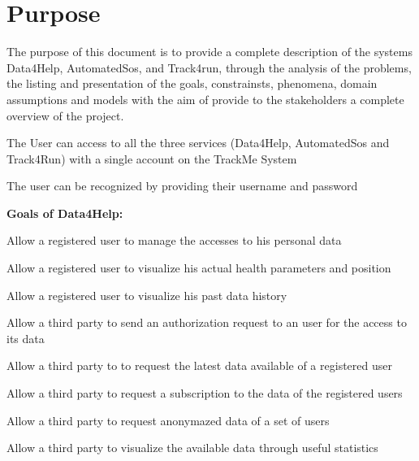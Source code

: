\section{Purpose}
The purpose of this document is to provide a complete description of the systems Data4Help, AutomatedSos, and Track4run, through the analysis of the problems, the listing and presentation of the goals, constrainsts, phenomena, domain assumptions and models with the aim of provide to the stakeholders a complete overview of the project.

\begin{goalList}
\begin{enumerate}[label={[}G\arabic*{]}]

    \item \label{goal:trackme1} The User can access to all the three services (Data4Help, AutomatedSos and Track4Run) with a single account on the TrackMe System
    \item \label{goal:trackme2}The user can be recognized by providing their username and password
    
\end{enumerate}

\textbf{Goals of Data4Help:}
\begin{enumerate}[label={[}G3.\arabic*{]}]

    \item \label{goal:user1} Allow a registered user to manage the accesses to his personal     data
    \item \label{goal:user2}Allow a registered user to visualize his actual health     parameters and position
    \item \label{goal:user3}Allow a registered user to visualize his past data history
    \item \label{goal:parties1}Allow a third party to send an authorization request to an     user for the access to its data
    \item \label{goal:parties2}Allow a third party to to request the latest data available     of a registered user
    \item \label{goal:parties3}Allow a third party to request a subscription to the data of the registered users
    \item \label{goal:parties4}Allow a third party to request anonymazed data of a set of     users 
    \item \label{goal:parties5}Allow a third party to visualize the available data through     useful statistics 
    \newline
    

\end{enumerate}
\end{goalList}
